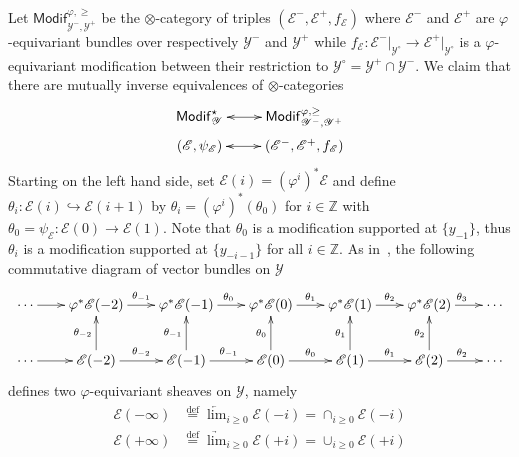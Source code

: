 \documentclass[11pt]{article}
\theoremstyle{definition}
\numberwithin{equation}{section}
\numberwithin{figure}{section}
\numberwithin{table}{section}
\newcommand{\Modif}{\mathsf{Modif}}
\newcommand{\eqd}{\stackrel{\mathrm{def}}{=}}
\begin{document}
\subsubsection{}\label{subsec:FromModif*2ModifAn}

Let $\Modif_{\mathscr{Y}^{-},\mathscr{Y}^{+}}^{\varphi,\geq}$ be the $\otimes$-category of triples $(\mathscr{E}^{-},\mathscr{E}^{+},f_{\mathscr{E}})$ where $\mathscr{E}^{-}$ and $\mathscr{E}^{+}$ are $\varphi$-equivariant bundles over respectively $\mathscr{Y}^{-}$ and $\mathscr{Y}^{+}$ while $f_{\mathscr{E}}:\mathscr{E}^{-}\vert_{\mathscr{Y}^{\circ}}\rightarrow\mathscr{E}^{+}\vert_{\mathscr{Y}^{\circ}}$ is a $\varphi$-equivariant modification between their restriction to $\mathscr{Y}^{\circ}=\mathscr{Y}^{+}\cap\mathscr{Y}^{-}$. We claim that there are mutually inverse equivalences of $\otimes$-categories
\[
\xymatrix@R=0.2pc{\Modif_{\mathscr{Y}}^{\star}\ar@{<->}[r] & \Modif_{\mathscr{Y}^{-},\mathscr{Y}^{+}}^{\varphi,\geq}\\
(\mathscr{E},\psi_{\mathscr{E}})\ar@{<->}[r] & \left(\mathscr{E}^{-},\mathscr{E}^{+},f_{\mathscr{E}}\right) }
\]
Starting on the left hand side, set $\mathscr{E}(i)=(\varphi^{i})^{\ast}\mathscr{E}$ and define $\theta_{i}:\mathscr{E}(i)\hookrightarrow\mathscr{E}(i+1)$ by $\theta_{i}=(\varphi^{i})^{\ast}(\theta_{0})$ for $i\in\mathbb{Z}$ with $\theta_{0}=\psi_{\mathscr{E}}:\mathscr{E}(0)\rightarrow\mathscr{E}(1)$. Note that $\theta_{0}$ is a modification supported at $\{y_{-1}\}$, thus $\theta_{i}$ is a modification supported at $\{y_{-i-1}\}$ for all $i\in\mathbb{Z}$. As in~\cite[\S 4.4]{Fa15}, the following commutative diagram of vector bundles on $\mathscr{Y}$
\[
\xymatrix@R=2pc@C=1.6pc{\cdots\ar[r] & \varphi^{\ast}\mathscr{\mathscr{E}}(-2)\ar[r]^{\theta_{-1}} & \varphi^{\ast}\mathscr{\mathscr{E}}(-1)\ar[r]^{\theta_{0}} & \varphi^{\ast}\mathscr{E}(0)\ar[r]^{\theta_{1}} & \varphi^{\ast}\mathscr{\mathscr{E}}(1)\ar[r]^{\theta_{2}} & \varphi^{\ast}\mathscr{\mathscr{E}}(2)\ar[r]^{\theta_{3}} & \cdots\\
\cdots\ar[r] & \mathscr{\mathscr{E}}(-2)\ar[r]^{\theta_{-2}}\ar[u]^{\theta_{-2}} & \mathscr{\mathscr{E}}(-1)\ar[r]^{\theta_{-1}}\ar[u]^{\theta_{-1}} & \mathscr{E}(0)\ar[r]^{\theta_{0}}\ar[u]^{\theta_{0}} & \mathscr{\mathscr{E}}(1)\ar[r]^{\theta_{1}}\ar[u]^{\theta_{1}} & \mathscr{\mathscr{E}}(2)\ar[r]^{\theta_{2}}\ar[u]^{\theta_{2}} & \cdots }
\]
defines two $\varphi$-equivariant sheaves on $\mathscr{Y}$, namely
\begin{align*}
\mathscr{\mathscr{E}}(-\infty) & \eqd \underleftarrow{\lim}_{i\geq0}\mathscr{\mathscr{E}}(-i) = \cap_{i\geq0}\mathscr{\mathscr{E}}(-i)\\
\mathscr{\mathscr{E}}(+\infty) & \eqd \underrightarrow{\lim}_{i\geq0}\mathscr{E}(+i) = \cup_{i\geq0}\mathscr{\mathscr{E}}(+i)
\end{align*}
\end{document}
